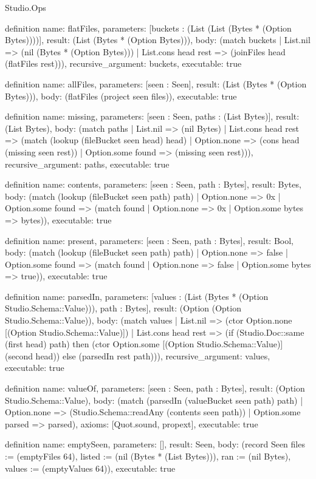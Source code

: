 \begin{lexlean}{Studio.Ops}
\begin{semanticmodule}
definition{
  name: flatFiles,
  parameters: [buckets : (List (List (Bytes * (Option Bytes))))],
  result: (List (Bytes * (Option Bytes))),
  body: (match buckets
    | List.nil => (nil (Bytes * (Option Bytes)))
    | List.cons head rest => (joinFiles head (flatFiles rest))),
  recursive_argument: buckets,
  executable: true
}

definition{
  name: allFiles,
  parameters: [seen : Seen],
  result: (List (Bytes * (Option Bytes))),
  body: (flatFiles (project seen files)),
  executable: true
}


definition{
  name: missing,
  parameters: [seen : Seen, paths : (List Bytes)],
  result: (List Bytes),
  body: (match paths
    | List.nil => (nil Bytes)
    | List.cons head rest => (match (lookup (fileBucket seen head) head)
      | Option.none => (cons head (missing seen rest))
      | Option.some found => (missing seen rest))),
  recursive_argument: paths,
  executable: true
}


definition{
  name: contents,
  parameters: [seen : Seen, path : Bytes],
  result: Bytes,
  body: (match (lookup (fileBucket seen path) path)
    | Option.none => 0x
    | Option.some found => (match found
      | Option.none => 0x
      | Option.some bytes => bytes)),
  executable: true
}


definition{
  name: present,
  parameters: [seen : Seen, path : Bytes],
  result: Bool,
  body: (match (lookup (fileBucket seen path) path)
    | Option.none => false
    | Option.some found => (match found
      | Option.none => false
      | Option.some bytes => true)),
  executable: true
}


definition{
  name: parsedIn,
  parameters: [values : (List (Bytes * (Option Studio.Schema::Value))), path : Bytes],
  result: (Option (Option Studio.Schema::Value)),
  body: (match values
    | List.nil => (ctor Option.none [(Option Studio.Schema::Value)])
    | List.cons head rest => (if (Studio.Doc::same (first head) path) then (ctor Option.some [(Option Studio.Schema::Value)] (second head)) else (parsedIn rest path))),
  recursive_argument: values,
  executable: true
}

definition{
  name: valueOf,
  parameters: [seen : Seen, path : Bytes],
  result: (Option Studio.Schema::Value),
  body: (match (parsedIn (valueBucket seen path) path)
    | Option.none => (Studio.Schema::readAny (contents seen path))
    | Option.some parsed => parsed),
  axioms: [Quot.sound, propext],
  executable: true
}

definition{
  name: emptySeen,
  parameters: [],
  result: Seen,
  body: (record Seen {files := (emptyFiles 64), listed := (nil (Bytes * (List Bytes))), ran := (nil Bytes), values := (emptyValues 64)}),
  executable: true
}


\end{semanticmodule}
\end{lexlean}
